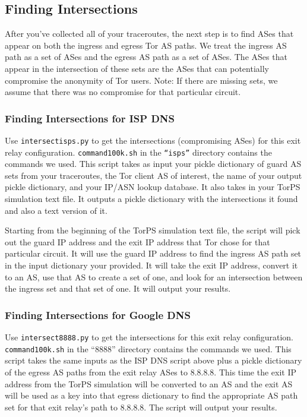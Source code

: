 \documentclass{article}
\begin{document}
\subsection{Finding Intersections}
After you've collected all of your traceroutes, the next step is to find ASes that 
appear on both the ingress and egress Tor AS paths. We treat the ingress AS path 
as a set of ASes and the egress AS path as a set of ASes. The ASes that appear 
in the intersection of these sets are the ASes that can potentially compromise 
the anonymity of Tor users. Note: If there are missing sets, we assume that 
there was no compromise for that particular circuit.

\subsubsection{Finding Intersections for ISP DNS}
Use {\tt intersect\textunderscore isps.py} to get the intersections (compromising ASes) for 
this exit relay configuration. {\tt command\textunderscore 100k.sh} in the {\tt ``isps''} 
directory contains the commands we used. 
This script takes as input your pickle dictionary of 
guard AS sets from your traceroutes, the Tor client AS of interest, the name of your 
output pickle 
dictionary, and your IP/ASN lookup database. It also takes in your TorPS simulation 
text file. It outputs a pickle dictionary with the intersections it found and also 
a text version of it. 

Starting from the beginning of the TorPS simulation text file, 
the script will pick out the guard IP address and the exit IP address that 
Tor chose for that particular circuit. It will use the guard IP address to find 
the ingress AS path set in the input dictionary your provided. It will take the 
exit IP address, convert it to an AS, use that AS to create a set of one, and 
look for an intersection between the ingress set and that set of one. It will 
output your results.

\subsubsection{Finding Intersections for Google DNS}
Use {\tt intersect\textunderscore 8888.py} to get the intersections for 
this exit relay configuration. {\tt command\textunderscore 100k.sh} in the ``8888'' 
directory contains the commands we used. This script takes the same inputs as the ISP 
DNS script above 
plus a pickle dictionary of the egress AS paths from the exit relay ASes to 8.8.8.8. 
This time the exit IP address from the TorPS simulation will be converted to an 
AS and the exit AS will be used as a key 
into that egress dictionary to find the appropriate AS path set for that exit relay's 
path to 8.8.8.8. The script will output your results.
\end{document}
